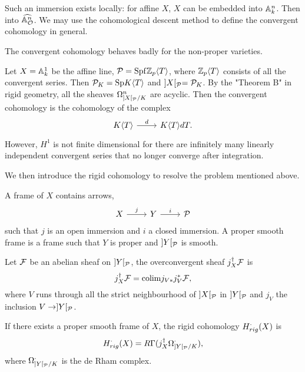 \begin{remark}
    Such an immersion exists locally: for affine $X$, $X$ can be embedded into ${\mathbb {A}}_k^n$. 
    Then into $\widehat{{\mathbb {A}}^n_{{\mathcal {O}}}}$. 
    We may use the cohomological descent method 
    to define the convergent cohomology in general. 
\end{remark}

The convergent cohomology behaves badly for the non-proper varieties.
\begin{example}
    \label{counter ex}
    Let $X = {\mathbb {A}}_k^1$ be the affine line, ${\mathcal {P}} = \mathrm{Spf} {\mathbb {Z}}_p \langle T \rangle$, 
    where ${\mathbb {Z}}_p \langle T \rangle$ consists of all the convergent series. 
    Then ${\mathcal {P}}_K = \mathrm{Sp} K \langle T \rangle$ and $]X[_{\mathcal {P}} = {\mathcal {P}}_K$. 
    By the "Theorem B" in rigid geometry, all the sheaves $\Omega_{]X[_{\mathcal {P}}/K}^n$ are acyclic. 
    Then the convergent cohomology is the cohomology of the complex
    \[
        \begin{tikzcd}
            K \langle T \rangle \ar[r,"d"] & K \langle T \rangle dT.
        \end{tikzcd}
    \]
    However, $H^1$ is not finite dimensional 
    for there are infinitely many linearly independent convergent series 
    that no longer converge after integration.
\end{example}

We then introduce the rigid cohomology to resolve the problem mentioned above.
\begin{definition}
    A frame of $X$ contains arrows,
    \[
        \begin{tikzcd}
            X \ar[r,"j"] & Y \ar[r,"i"] & \CP
        \end{tikzcd}
    \]
    such that $j$ is an open immersion and $i$ a closed immersion. 
    A proper smooth frame is a frame such that $Y$ is proper and $]Y[_{\mathcal {P}}$ is smooth. 
\end{definition}

\begin{definition}
    Let ${\mathcal {F}}$ be an abelian sheaf on $]Y[_{\mathcal {P}}$, 
    the overconvergent sheaf $j_X^\dagger {\mathcal {F}}$ is 
    \[
        j_X^\dagger {\mathcal {F}} = \mathrm{colim} j_{V*} j_{V}^* {\mathcal {F}},
    \]
    where $V$ runs through all the strict neighbourhood of $]X[_{\mathcal {P}}$ in $]Y[_{\mathcal {P}}$ 
    and $j_V$ the inclusion $V \to ]Y[_{\mathcal {P}}$. 
\end{definition}

\begin{definition}
    If there exists a proper smooth frame of $X$, the rigid cohomology $H^\cdot_{rig}(X)$ is 
    \[
        H^\cdot_{rig}(X) = R\Gamma(j_X^ \dagger \Omega_{]Y[_{\mathcal {P}}/K}^\cdot),
    \]
    where $\Omega_{]Y[_{\mathcal {P}}/K}^\cdot$ is the de Rham complex.
\end{definition}

